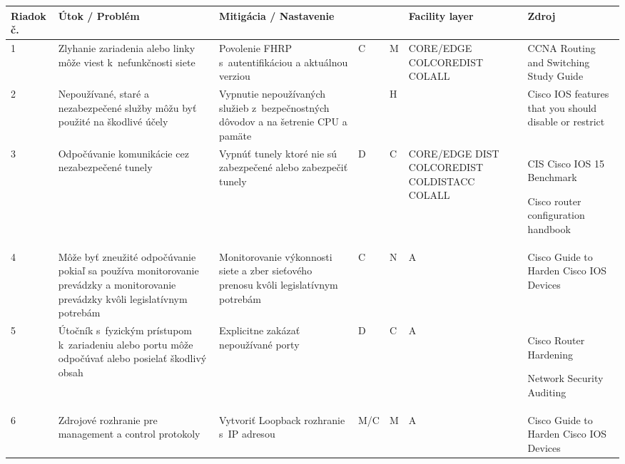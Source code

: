 \begin{longtable}[!htbp]{|C{2.5em}L{9em}L{9em}C{2em}C{2.5em}C{7.5em}L{10em}|}
	
	\hline
	\centering
	
	Riadok č.	&Útok / Problém	&Mitigácia / Nastavenie	& 	&	&Facility layer	&Zdroj\\
	\endhead
	
	 1	&Zlyhanie zariadenia alebo linky môže viest k~nefunkčnosti siete 	&Povolenie FHRP s~autentifikáciou a aktuálnou verziou	&C	&M	&CORE/EDGE
	COLCOREDIST
	COLALL	&CCNA Routing and Switching Study Guide \cite{Lammle2013}\\
	2	&Nepoužívané, staré a nezabezpečené služby môžu byť použité na škodlivé účely	&Vypnutie nepoužívaných služieb z~bezpečnostných dôvodov a na šetrenie CPU a pamäte 	& {\normalsize*}\footnotemark &H	&{\normalsize*}\footnotemark[\value{footnote}] &Cisco IOS features that you should disable or restrict \cite{yDzYjF1hoACahpg1}\\
	 3	&Odpočúvanie komunikácie  cez nezabezpečené tunely	&Vypnúť tunely ktoré nie sú zabezpečené alebo zabezpečiť tunely	&D	&C	&CORE/EDGE
	DIST
	COLCOREDIST
	COLDISTACC
	COLALL	&CIS Cisco IOS 15 Benchmark \cite{CIS_DrTLsgXv24lxeIIM}
	
	Cisco router configuration handbook \cite{Hucaby2010}\\
	4	&Môže byť zneužité odpočúvanie pokiaľ sa používa monitorovanie prevádzky a monitorovanie prevádzky kvôli legislatívnym potrebám	&Monitorovanie výkonnosti siete a zber sieťového prenosu kvôli legislatívnym potrebám	&C	&N	&A	&Cisco Guide to Harden Cisco IOS Devices \cite{Singh2018}\\
	 5	&Útočník s~fyzickým prístupom k~zariadeniu alebo portu môže odpočúvať alebo posielať škodlivý obsah	&Explicitne zakázať nepoužívané porty	&D	&C	&A	&Cisco Router Hardening \cite{Graesser2001}
	
	Network Security Auditing \cite{Jackson2010}\\
	6	&Zdrojové rozhranie pre management a control protokoly	&Vytvoriť Loopback rozhranie s~IP adresou	&M/C	&M	&A	&
	Cisco Guide to Harden Cisco IOS Devices \cite{Singh2018}
	

\end{longtable}
